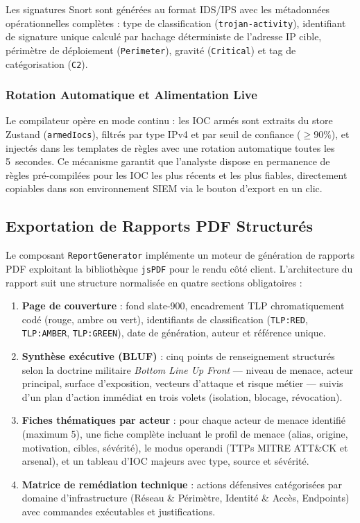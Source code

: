 Les signatures Snort sont générées au format IDS/IPS avec les métadonnées opérationnelles complètes : type de classification (\texttt{trojan-activity}), identifiant de signature unique calculé par hachage déterministe de l'adresse IP cible, périmètre de déploiement (\texttt{Perimeter}), gravité (\texttt{Critical}) et tag de catégorisation (\texttt{C2}).

\subsubsection{Rotation Automatique et Alimentation Live}

Le compilateur opère en mode continu : les IOC armés sont extraits du store Zustand (\texttt{armedIocs}), filtrés par type IPv4 et par seuil de confiance ($\geq 90\%$), et injectés dans les templates de règles avec une rotation automatique toutes les 5~secondes. Ce mécanisme garantit que l'analyste dispose en permanence de règles pré-compilées pour les IOC les plus récents et les plus fiables, directement copiables dans son environnement SIEM via le bouton d'export en un clic.

\subsection{Exportation de Rapports PDF Structurés}

Le composant \texttt{ReportGenerator} implémente un moteur de génération de rapports PDF exploitant la bibliothèque \texttt{jsPDF} pour le rendu côté client. L'architecture du rapport suit une structure normalisée en quatre sections obligatoires :

\begin{enumerate}
    \item \textbf{Page de couverture} : fond slate-900, encadrement TLP chromatiquement codé (rouge, ambre ou vert), identifiants de classification (\texttt{TLP:RED}, \texttt{TLP:AMBER}, \texttt{TLP:GREEN}), date de génération, auteur et référence unique.
    \item \textbf{Synthèse exécutive (BLUF)} : cinq points de renseignement structurés selon la doctrine militaire \textit{Bottom Line Up Front} --- niveau de menace, acteur principal, surface d'exposition, vecteurs d'attaque et risque métier --- suivis d'un plan d'action immédiat en trois volets (isolation, blocage, révocation).
    \item \textbf{Fiches thématiques par acteur} : pour chaque acteur de menace identifié (maximum 5), une fiche complète incluant le profil de menace (alias, origine, motivation, cibles, sévérité), le modus operandi (TTPs MITRE ATT\&CK et arsenal), et un tableau d'IOC majeurs avec type, source et sévérité.
    \item \textbf{Matrice de remédiation technique} : actions défensives catégorisées par domaine d'infrastructure (Réseau \& Périmètre, Identité \& Accès, Endpoints) avec commandes exécutables et justifications.
\end{enumerate}

